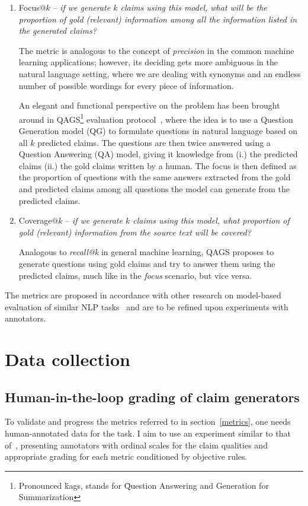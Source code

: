 \begin{enumerate}
    \item {\techbf Focus}$@k$ -- \textit{if we generate $k$ claims using this model, what will be the proportion of gold (relevant) information among all the information listed in the generated claims?}
    
    The metric is analogous to the concept of \textit{precision} in the common machine learning applications; however, its deciding gets more ambiguous in the natural language setting, where we are dealing with synonyms and an endless number of possible wordings for every piece of information.

    An elegant and functional perspective on the problem has been brought around in QAGS\footnote{Pronounced \"{kags}, stands for \"{Question Answering and Generation for Summarization}} evaluation protocol~\cite{wang-etal-2020-asking}, where the idea is to use a Question Generation model (QG) to formulate questions in natural language based on all $k$ predicted claims. The questions are then twice answered using a Question Answering (QA) model, giving it knowledge from (i.) the predicted claims (ii.) the gold claims written by a human.
    The focus is then defined as the proportion of questions with the same answers extracted from the gold and predicted claims among all questions the model can generate from the predicted claims. 

    \item {\techbf Coverage}$@k$ -- \textit{if we generate $k$ claims using this model, what proportion of gold (relevant) information from the source text will be covered?}
    
    Analogous to \textit{recall@k} in general machine learning, QAGS proposes to generate questions using gold claims and try to answer them using the predicted claims, much like in the \textit{focus} scenario, but vice versa.
\end{enumerate}
The metrics are proposed in accordance with other research on model-based evaluation of similar NLP tasks~\cite{ffci,wright} and are to be refined upon experiments with annotators.

\section{Data collection}
\subsection{Human-in-the-loop grading of claim generators}
To validate and progress the metrics referred to in section~\ref{metrics}, one needs human-annotated data for the task.
I aim to use an experiment similar to that of~\cite{wright}, presenting annotators with ordinal scales for the claim qualities and appropriate grading for each metric conditioned by objective rules.

